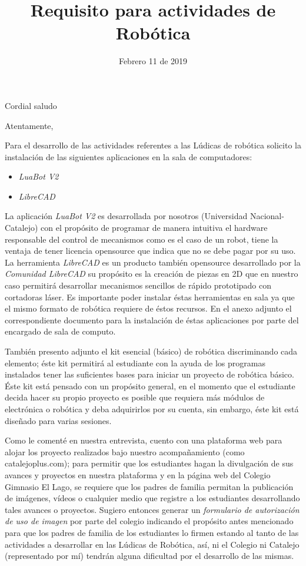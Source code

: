 \documentclass[11pt,a4paper,sans]{moderncv}        %
\title{Requisito para actividades de Robótica}                               %
\begin{document}
\date{Febrero 11 de 2019}
\opening{Cordial saludo}
\closing{Atentamente,}
\makelettertitle{}

Para el desarrollo de las actividades referentes a las Lúdicas de robótica solicito la instalación de las
siguientes aplicaciones en la sala de computadores:

\begin{itemize}
  \item \textit{LuaBot V2}
  \item \textit{LibreCAD}
\end{itemize}

La aplicación \textit{LuaBot V2} es desarrollada por nosotros (Universidad Nacional-Catalejo) con el propósito
de programar de manera intuitiva el hardware responsable del control de mecanismos como es el caso de un robot,
tiene la ventaja de tener licencia opensource que indica que no se debe pagar por su uso. La herramienta \textit{LibreCAD}
es un producto también opensource desarrollado por la \textit{Comunidad LibreCAD} su propósito es la creación de
piezas en 2D que en nuestro caso permitirá desarrollar mecanismos sencillos de rápido prototipado con cortadoras láser.
Es importante poder instalar éstas herramientas en sala ya que el mismo formato de robótica requiere de éstos recursos.
En el anexo adjunto el correspondiente documento para la instalación de éstas aplicaciones por parte del encargado de sala de computo.

También presento adjunto el kit esencial (básico) de robótica discriminando cada elemento; éste kit permitirá al estudiante
con la ayuda de los programas instalados tener las suficientes bases para iniciar un proyecto de robótica básico. Éste kit está
pensado con un propósito general, en el momento que el estudiante decida hacer su propio proyecto es posible que requiera más módulos
de electrónica o robótica y deba adquirirlos por su cuenta, sin embargo, éste kit está diseñado para varias sesiones.

Como le comenté en nuestra entrevista, cuento con una plataforma web para alojar los proyecto realizados bajo nuestro acompañamiento
(como catalejoplus.com); para permitir que los estudiantes hagan la divulgación de sus avances y proyectos en nuestra plataforma y en la
página web del Colegio Gimnasio El Lago, se requiere que los padres de familia permitan la publicación de imágenes, vídeos o cualquier medio
que registre a los estudiantes desarrollando tales avances o proyectos. Sugiero entonces generar un \textit{formulario de autorización de uso de imagen}
por parte del colegio indicando el propósito antes mencionado para que los padres de familia de los estudiantes lo firmen estando al tanto
de las actividades a desarrollar en las Lúdicas de Robótica, así, ni el Colegio ni Catalejo (representado por mí) tendrán alguna dificultad por el
desarrollo de las mismas.

\makeletterclosing{}
\end{document}
